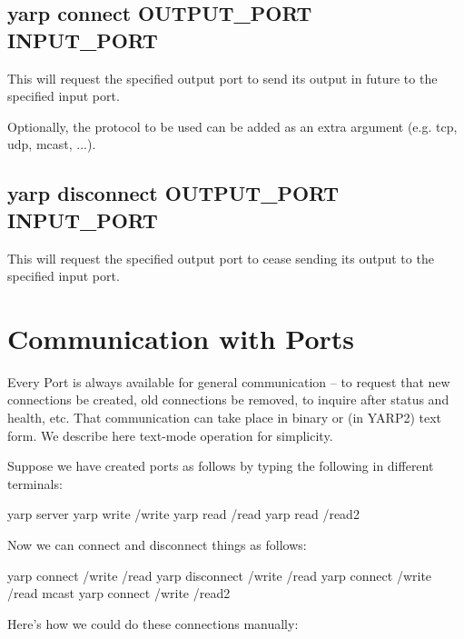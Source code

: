 \documentclass[a4]{article}
\begin{document}
\subsection{yarp connect OUTPUT\_PORT INPUT\_PORT}

This will request the specified output port to send its output in 
future to the specified input port.

Optionally, the protocol to be used can be added as an extra argument
(e.g. tcp, udp, mcast, ...).

\subsection{yarp disconnect OUTPUT\_PORT INPUT\_PORT}

This will request the specified output port to cease sending its output to
the specified input port.



\section{Communication with Ports}

Every Port is always available for general communication -- to request
that new connections be created, old connections be removed, to
inquire after status and health, etc.  That communication can take
place in binary or (in YARP2) text form.  We describe here text-mode
operation for simplicity.

Suppose we have created ports as follows by typing the following in
different terminals:
\begin{code}
  yarp server
  yarp write /write
  yarp read /read
  yarp read /read2
\end{code}
%
Now we can connect and disconnect things as follows:
\begin{code}
  yarp connect /write /read
  yarp disconnect /write /read
  yarp connect /write /read mcast
  yarp connect /write /read2
\end{code}

Here's how we could do these connections manually:
\end{document}
